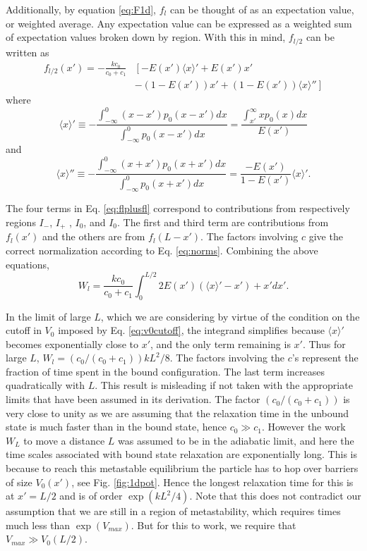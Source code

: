 \documentclass[journal = mamobx, manuscript = article]{achemso}
\begin{document}
Additionally, by equation \ref{eq:F1d}, $f_l$ can be thought of as an expectation value, or weighted average. Any expectation value can be expressed as a weighted sum of expectation values broken down by region. With this in mind, $f_{l/2}$ can be written as
\begin{align}
\label{eq:flplusfl}
f_{l/2}(x')=-\frac{k c_0}{c_0+c_1} &\left[-E(x')\langle x \rangle' +  E(x') x' \right.\nonumber\\
&\left. -(1-E(x'))x' + (1-E(x'))\langle x\rangle''\right]
\end{align}
where
\begin{equation}
\langle x \rangle' \equiv -\frac{\int_{-\infty}^0 (x-x')p_0(x-x')dx}{\int_{-\infty}^0 p_0(x-x')dx} 
= \frac{\int_{x'}^\infty x p_0(x)dx}{E(x')}
\end{equation}
and
\begin{equation}
\langle x \rangle'' \equiv -\frac{\int_{-\infty}^0 (x+x')p_0(x+x')dx}{\int_{-\infty}^0 p_0(x+x')dx} 
= \frac{-E(x')}{1-E(x')} \langle x \rangle' .
\end{equation}

The four terms in Eq. \ref{eq:flplusfl} correspond to contributions from respectively regions $I_-$, $I_+$ , $I_0$, and
$I_0$. The first and third term are contributions from $f_l(x')$ and the others
are from $f_l(L-x')$. The factors involving $c$ give the correct normalization
according to Eq. \ref{eq:norms}. Combining the above equations, 
\begin{equation}
W_l = \frac{k c_0}{c_0+c_1} \int_0^{L/2} 2 E(x')(\langle x\rangle' - x') + x' dx' .
\end{equation}


In the limit of large $L$, which we are considering by virtue of the condition
on the cutoff in $V_0$ imposed by Eq. \ref{eq:v0cutoff}, the integrand
simplifies because $\langle x\rangle'$ becomes exponentially close to $x'$, and
the only term remaining is $x'$. Thus for large $L$, $W_l = (c_0/(c_0+c_1))k L^2/8$.
The factors involving the $c$'s represent the fraction of time spent in the
bound configuration. The last term increases quadratically with $L$. This result
is misleading if not taken with the appropriate limits that have been assumed in
its derivation. The factor $(c_0/(c_0+c_1))$ is very close to unity as we are
assuming that the relaxation time in the unbound state is much faster than in
the bound state, hence $c_0 \gg c_1$. However the work $W_L$ to move a distance
$L$ was assumed to be in the adiabatic limit, and here the time scales
associated with bound state relaxation are exponentially long. This is because
to reach this metastable equilibrium the particle has to hop over barriers of
size $V_0(x')$, see Fig. \ref{fig:1dpot}. Hence the  longest relaxation time for this is
at $x'=L/2$ and is of order $\exp(kL^2/4)$. Note that this does not contradict
our assumption that we are still in a region of metastability, which requires
times much less than $\exp(V_{max})$. But for this to work, we require that $V_{max} \gg V_0(L/2)$.
\end{document}
